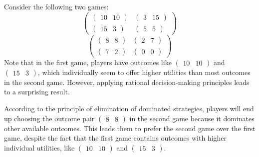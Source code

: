 \begin{example}
    Consider the following two games:
    \[\begin{pmatrix} \begin{pmatrix} 10 & 10 \end{pmatrix} & \begin{pmatrix} 3 & 15 \end{pmatrix} \\ \begin{pmatrix} 15 & 3 \end{pmatrix} & \begin{pmatrix} 5 & 5 \end{pmatrix} \end{pmatrix}\]
    \[\begin{pmatrix} \begin{pmatrix} 8 & 8 \end{pmatrix} & \begin{pmatrix} 2 & 7 \end{pmatrix} \\ \begin{pmatrix} 7 & 2 \end{pmatrix} & \begin{pmatrix} 0 & 0 \end{pmatrix} \end{pmatrix}\]
    Note that in the first game, players have outcomes like $\begin{pmatrix} 10 & 10 \end{pmatrix}$ and $\begin{pmatrix} 15 & 3 \end{pmatrix}$, which individually seem to offer higher utilities than most outcomes in the second game.
    However, applying rational decision-making principles leads to a surprising result.

    According to the principle of elimination of dominated strategies, players will end up choosing the outcome pair $\begin{pmatrix} 8 & 8 \end{pmatrix}$ in the second game because it dominates other available outcomes.
    This leads them to prefer the second game over the first game, despite the fact that the first game contains outcomes with higher individual utilities, like $\begin{pmatrix} 10 & 10 \end{pmatrix}$ and $\begin{pmatrix} 15 & 3 \end{pmatrix}$.


\end{example}
